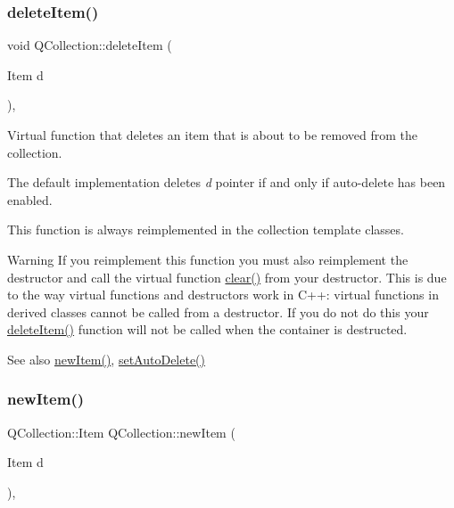 \subsubsection{\texorpdfstring{deleteItem()}{deleteItem()}}
{\footnotesize\ttfamily void Q\+Collection\+::delete\+Item (\begin{DoxyParamCaption}\item[{Item}]{d }\end{DoxyParamCaption})\hspace{0.3cm}{\ttfamily [protected]}, {\ttfamily [virtual]}}

Virtual function that deletes an item that is about to be removed from the collection.

The default implementation deletes {\itshape d} pointer if and only if auto-\/delete has been enabled.

This function is always reimplemented in the collection template classes.

\begin{DoxyWarning}{Warning}
If you reimplement this function you must also reimplement the destructor and call the virtual function \mbox{\hyperlink{class_q_collection_a92416cc22907550389aad04c26be2f77}{clear()}} from your destructor. This is due to the way virtual functions and destructors work in C++\+: virtual functions in derived classes cannot be called from a destructor. If you do not do this your \mbox{\hyperlink{class_q_collection_ab6c7cf56b681ba4fed6cf6a92494a410}{delete\+Item()}} function will not be called when the container is destructed.
\end{DoxyWarning}
\begin{DoxySeeAlso}{See also}
\mbox{\hyperlink{class_q_collection_a8a439f0c342ff1844a797fbea15b2283}{new\+Item()}}, \mbox{\hyperlink{class_q_collection_a6ed41913c76bfba54be6da26015ee3f3}{set\+Auto\+Delete()}} 
\end{DoxySeeAlso}
\mbox{\label{class_q_collection_a8a439f0c342ff1844a797fbea15b2283}} 
\subsubsection{\texorpdfstring{newItem()}{newItem()}}
{\footnotesize\ttfamily Q\+Collection\+::\+Item Q\+Collection\+::new\+Item (\begin{DoxyParamCaption}\item[{Item}]{d }\end{DoxyParamCaption})\hspace{0.3cm}{\ttfamily [protected]}, {\ttfamily [virtual]}}

